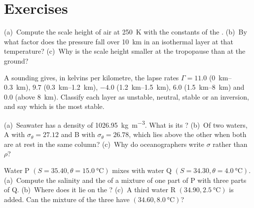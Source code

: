 \section{Exercises}

\begin{exercise}[$\star$]\label{exo:b1:fluid-envelopes-structure:1}
(a)~Compute the scale height of air at \qty{250}{K} with the constants of the
. (b)~By what factor does the pressure fall over \qty{10}{km}
in an isothermal layer at that temperature? (c)~Why is the scale height smaller
at the tropopause than at the ground?
\end{exercise}

\begin{exercise}[$\star$]\label{exo:b1:fluid-envelopes-structure:2}
A sounding gives, in kelvins per kilometre, the lapse rates $\Gamma = 11.0$
(\qtyrange{0}{0.3}{km}), $9.7$ (\qtyrange{0.3}{1.2}{km}), $-4.0$
(\qtyrange{1.2}{1.5}{km}), $6.0$ (\qtyrange{1.5}{8}{km}) and $0.0$ (above
\qty{8}{km}). Classify each layer as unstable, neutral, stable or an inversion,
and say which is the most stable.
\end{exercise}

\begin{exercise}[$\star$]\label{exo:b1:fluid-envelopes-structure:3}
(a)~Seawater has a density of \qty{1026.95}{kg.m^{-3}}. What is its ? (b)~Of two waters, A with $\sigma_\theta = 27.12$ and B with
$\sigma_\theta = 26.78$, which lies above the other when both are at rest in the
same column? (c)~Why do oceanographers write $\sigma$ rather than $\rho$?
\end{exercise}

\begin{exercise}[$\star$]\label{exo:b1:fluid-envelopes-structure:4}
Water P $(S = 35.40, \theta = \qty{15.0}{\celsius})$ mixes with water Q $(S =
34.30, \theta = \qty{4.0}{\celsius})$. (a)~Compute the salinity and the
 of a mixture of one part of P with three parts of Q.
(b)~Where does it lie on the ? (c)~A third water R $(34.90,
\qty{2.5}{\celsius})$ is added. Can the mixture of the three have
$(34.60, \qty{8.0}{\celsius})$?
\end{exercise}

